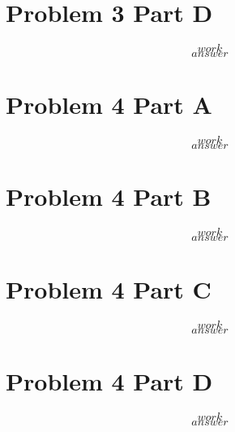 \documentclass{article}
\begin{document}
\section*{Problem 3 Part D}
\setcounter{equation}{0}
\begin{equation}
work
\end{equation}
\begin{equation*}
answer
\end{equation*}


\pagebreak

\section*{Problem 4 Part A}
\setcounter{equation}{0}
\begin{equation}
work
\end{equation}
\begin{equation*}
answer
\end{equation*}

\section*{Problem 4 Part B}
\setcounter{equation}{0}
\begin{equation}
work
\end{equation}
\begin{equation*}
answer
\end{equation*}

\section*{Problem 4 Part C}
\setcounter{equation}{0}
\begin{equation}
work
\end{equation}
\begin{equation*}
answer
\end{equation*}

\section*{Problem 4 Part D}
\setcounter{equation}{0}
\begin{equation}
work
\end{equation}
\begin{equation*}
answer
\end{equation*}
\end{document}
